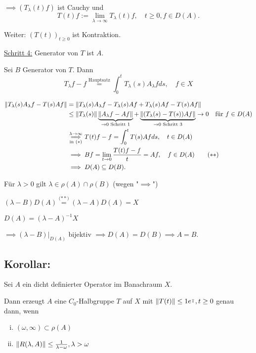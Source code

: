 $\implies (T_\lambda(t) f)$ ist Cauchy und
$$
T(t) f := \lim_{\lambda \to \infty} T_\lambda(t) f, \quad t \geq 0, f \in D(A).
$$ 

Weiter: $(T(t))_{t \geq 0}$ ist Kontraktion.

\underline{Schritt 4:} Generator von $T$ ist $A$.

Sei $B$ Generator von $T$. Dann
\begin{displaymath}
T_\lambda f - f \overset{\text{Hauptsatz}}{=} \int_0^t T_\lambda(s) A_\lambda f ds, \quad f \in X \tag{$\ast$}
\end{displaymath}

\begin{align*}
\lVert T_\lambda(s) A_\lambda f - T(s) A f \rVert
&= \lVert T_\lambda(s) A_\lambda f - T_\lambda(s)Af + T_\lambda(s) Af - T(s) Af  \rVert \\
&\leq \lVert T_\lambda(s)  \rVert \underbrace{\lVert A_\lambda f - A f \rVert}_{\to 0 \text{ Schritt 1}} + \underbrace{\lVert (T_\lambda(s) - T(s))Af  \rVert}_{\to 0 \text{ Schritt 3}} \to 0 \quad\text{für } f \in D(A) \\
&\overset{\lambda \to \infty}{\underset{\text{in ($\ast$)}}{\implies}} T(t) f - f = \int_0^t T(s) A f ds, \quad t \in D(A) \\
&\implies  Bf = \lim_{t \to 0} \frac{ T(t) f - f}{t} = Af, \quad f \in D(A) \tag{$\ast\ast$} \\
&\implies D(A) \subseteq D(B).
\end{align*}

Für $\lambda > 0$ gilt $\lambda \in \rho(A) \cap \rho(B)$ (wegen "$\implies$")

$(\lambda - B)D(A) \overset{\text{($\ast\ast$)}}{=} (\lambda - A) D(A) = X$

{\tiny{$D(A) = (\lambda - A)^{-1} X$}}

$\implies (\lambda - B)|_{D(A)}$ bijektiv $\implies D(A) = D(B) \implies A = B$.

\subsection{Korollar:}

Sei $A$ ein dicht definierter Operator im Banachraum $X$.

Dann erzeugt $A$ eine $C_0$-Halbgruppe $T$ auf $X$ mit $\lVert T(t) \rVert \leq 1 e^{\over t}, t \geq 0$ genau dann, wenn
\begin{enumerate}[i)]
  \item $(\omega, \infty) \subset \rho(A)$
  \item $\lVert R(\lambda, A) \rVert \leq \frac{1}{\lambda - \omega}, \lambda > \omega$ 
\end{enumerate}

